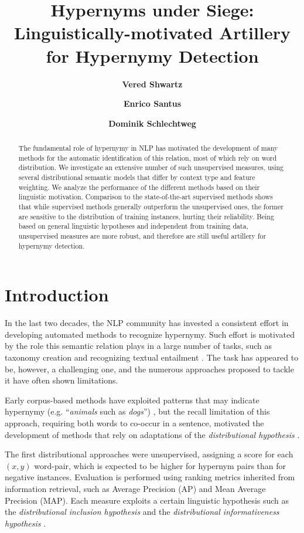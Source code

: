 \documentclass[11pt]{article}
\title{Hypernyms under Siege:\\Linguistically-motivated Artillery for Hypernymy Detection}
\author[1]{\bf Vered Shwartz}
\author[2,3]{\bf Enrico Santus}
\author[4]{\bf Dominik Schlechtweg}
\affil[1]{Bar-Ilan University\\Ramat-Gan, Israel}
\affil[2]{Singapore University of Technology and Design\\Singapore}
\affil[3]{The Hong Kong Polytechnic University\\Hong Kong}
\affil[4]{University of Stuttgart\\Stuttgart, Germany}
\affil[  ]{\mediumfont\tt  \{vered1986,esantus\}@gmail.com,~~dominik.schlechtweg@gmx.de}
\begin{document}
\maketitle

\begin{abstract}
The fundamental role of hypernymy in NLP has motivated the development of many methods for the automatic identification of this relation, most of which rely on word distribution. 
We investigate an extensive number of such unsupervised measures, using several distributional semantic models that differ by context type and feature weighting. We analyze the performance of the different methods based on their linguistic motivation.
Comparison to the state-of-the-art supervised methods shows that while supervised methods generally outperform the unsupervised ones, the former are sensitive to the distribution of training instances, hurting their reliability. Being based on general linguistic hypotheses and independent from training data, unsupervised measures are more robust, and therefore are still useful artillery for hypernymy detection.
\end{abstract}

\section{Introduction} 

In the last two decades, the NLP community has invested a consistent effort in developing automated methods to recognize hypernymy. Such effort is motivated by the role this semantic relation plays in a large number of tasks, such as taxonomy creation \cite{snow2006semantic,navigli2011graph} and recognizing textual entailment \cite{dagan2013recognizing}. The task has appeared to be, however, a challenging one, and the numerous approaches proposed to tackle it have often shown limitations.

Early corpus-based methods have exploited patterns that may indicate hypernymy (e.g. ``\emph{animals} such as \emph{dogs}'') \cite{hearst1992automatic,snow2004learning}, but the recall limitation of this approach, requiring both words to co-occur in a sentence, motivated the development of methods that rely on adaptations of the \emph{distributional hypothesis} \cite{harris1954distributional}. 

The first distributional approaches were unsupervised, assigning a score for each $(x,y)$ word-pair, which is expected to be higher for hypernym pairs than for negative instances. Evaluation is performed using ranking metrics inherited from information retrieval, such as Average Precision (AP) and Mean Average Precision (MAP). Each measure exploits a certain linguistic hypothesis such as the \emph{distributional inclusion hypothesis} \cite{weeds2003general,kotlerman2010directional} and the \emph{distributional informativeness hypothesis} \cite{santus2014chasing,rimell2014distributional}. 
\end{document}
